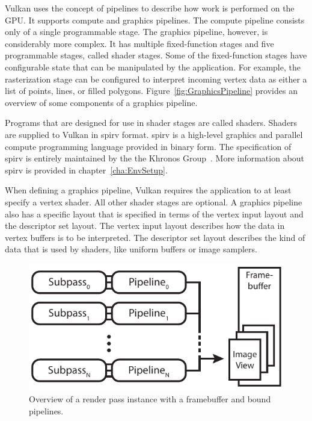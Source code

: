     Vulkan uses the concept of pipelines to describe how work is performed on the GPU.
    It supports compute and graphics pipelines.
    The compute pipeline consists only of a single programmable stage.
    The graphics pipeline, however, is considerably more complex.
    It has multiple fixed-function stages and five programmable stages, called shader stages.
    Some of the fixed-function stages have configurable state that can be manipulated by the \gls{application}.
    For example, the rasterization stage can be configured to interpret incoming vertex data as either a list of points, lines, or filled polygons.
    Figure~\ref{fig:GraphicsPipeline} provides an overview of some components of a graphics pipeline.

    Programs that are designed for use in shader stages are called shaders.
    Shaders are supplied to Vulkan in \gls{spirv} format.
    \gls{spirv} is a high-level graphics and parallel compute programming language provided in binary form.
    The specification of \gls{spirv} is entirely maintained by the the Khronos Group~\cite{spirvspecprov}.
    More information about \gls{spirv} is provided in chapter~\ref{cha:EnvSetup}.

    When defining a graphics pipeline, Vulkan requires the \gls{application} to at least specify a vertex shader.
    All other shader stages are optional.
    A graphics pipeline also has a specific layout that is specified in terms of the vertex input layout and the descriptor set layout.
    The vertex input layout describes how the data in vertex buffers is to be interpreted.
    The descriptor set layout describes the kind of data that is used by shaders, like uniform buffers or image samplers.


    \begin{figure}
      \label{fig:RenderPassInstanceSample}
      \centering
      \includegraphics[width=\textwidth]{Main/Images/RenderPassInstanceSample}
      \caption{Overview of a render pass instance with a framebuffer and bound pipelines.}
    \end{figure}

